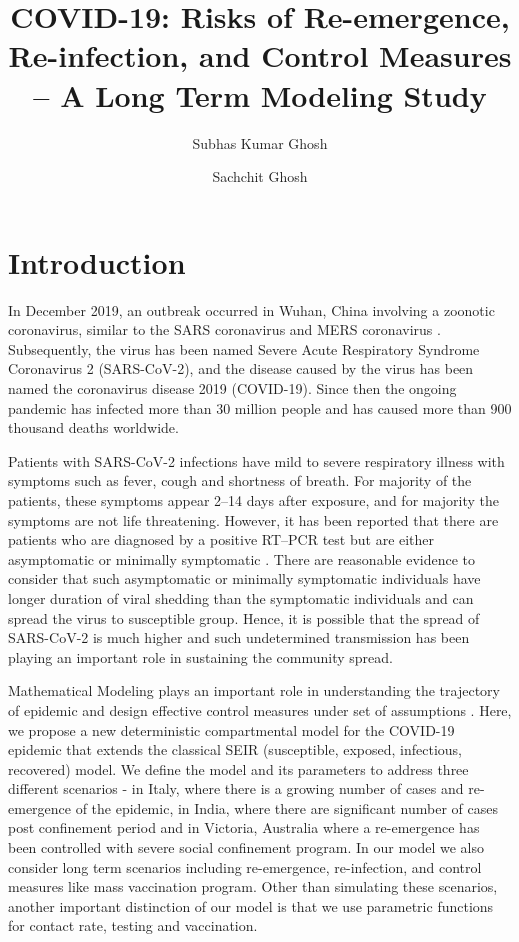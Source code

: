 \documentclass[fleqn,10pt]{wlscirep}
\title{COVID-19: Risks of Re-emergence, Re-infection, and Control Measures -- A Long Term Modeling Study}
\author[1,a]{Subhas Kumar Ghosh}
\author[2]{Sachchit Ghosh}
\affil[1]{Commonwealth Bank of Australia, Sydney, New South Wales, 2000, Australia}
\affil[2]{The University of Sydney, Camperdown, NSW 2006, Australia}
\affil[a]{subhas.ghosh@cba.com.au}
\begin{document}
	\flushbottom
	\maketitle
	\thispagestyle{empty}

\section*{Introduction}
\label{SEC1}
In December 2019, an outbreak occurred in Wuhan, China involving a zoonotic coronavirus, similar to the SARS coronavirus and MERS coronavirus  \cite{taaa021}. Subsequently, the virus has been named Severe Acute Respiratory Syndrome Coronavirus 2 (SARS-CoV-2), and the disease caused by the virus has been named the coronavirus disease 2019 (COVID-19). Since then the ongoing pandemic has infected more than 30 million people and has caused more than 900 thousand deaths worldwide.

Patients with SARS-CoV-2 infections have mild to severe respiratory illness with symptoms such as fever, cough and shortness of breath. For majority of the patients, these symptoms appear 2–14 days after exposure, and for majority the symptoms are not life threatening. However, it has been reported that there are patients who are diagnosed by a positive RT–PCR test but are either asymptomatic or minimally symptomatic \cite{pmid32146694,pmid32179137,pmid32083643,Kenji2020,Long2020}. There are reasonable evidence to consider that such asymptomatic or minimally symptomatic individuals have longer duration of viral shedding than the symptomatic individuals and can spread the virus to susceptible group\cite{Long2020}.  Hence, it is possible that the spread of SARS-CoV-2 is much higher and such undetermined transmission has been playing an important role in sustaining the community spread. 

Mathematical Modeling plays an important role in understanding the trajectory of epidemic and design effective control measures under set of assumptions \cite{539a5e40c4cf4e6a8dc8035b3930c45d,doi:10.1098/rspb.2004.2800,Giordano2020}. Here, we propose a new deterministic compartmental model for the COVID-19 epidemic that extends the classical SEIR (susceptible, exposed, infectious, recovered) model. We define the model and its parameters to address three different scenarios - in Italy, where there is a growing number of cases and re-emergence of the epidemic, in India, where there are significant number of cases post confinement period and in Victoria, Australia where a re-emergence has been controlled with severe social confinement program. In our model we also consider long term scenarios including re-emergence, re-infection, and control measures like mass vaccination program. Other than simulating these scenarios, another important distinction of our model is that we use parametric functions for contact rate, testing and vaccination.
\end{document}
